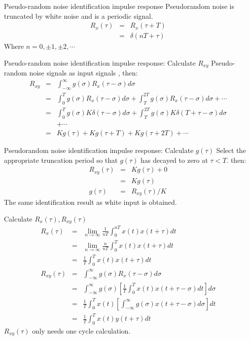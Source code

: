 \begin{frame}{Pseudo-random noise identification impulse response}
Pseudorandom noise is truncated by white noise and is a periodic signal.
\begin{eqnarray*}
R_x(\tau) &=& R_x(\tau+T) \\
&=& \delta(nT+\tau)
\end{eqnarray*}
Where $n=0,\pm 1,\pm 2,\cdots$
\end{frame}

\begin{frame}{Pseudo-random noise identification impulse response: Calculate $R_{xy}$}
Pseudo-random noise signals as input signals , then:
\begin{eqnarray*}
R_{xy} &=& \int_{-\infty}^{\infty} g(\sigma)R_x(\tau-\sigma)d\sigma \\
&=& \int_{0}^{T}g(\sigma)R_x(\tau-\sigma)d\sigma+\int_{T}^{2T}g(\sigma)R_x(\tau-\sigma)d\sigma +\cdots \\
&=& \int_0^T g(\sigma)K\delta(\tau-\sigma)d\sigma+\int_T^{2T}g(\sigma)K\delta(T+\tau-\sigma)d\sigma \\
&& +\cdots \\
&=& Kg(\tau)+Kg(\tau+T)+Kg(\tau+2T)+\cdots
\end{eqnarray*}
\end{frame}

\begin{frame}{Pseudorandom noise identification impulse response: Calculate $g(\tau)$}
Select the appropriate truncation period so that $g(\tau)$ has decayed to zero at $\tau<T$. then:
\begin{eqnarray*}
R_{xy}(\tau)&=& K g(\tau)+0 \\
&=& Kg(\tau) \\
g(\tau)&=& R_{xy}(\tau)/K
\end{eqnarray*}
The same identification result as white input is obtained.
\end{frame}

\begin{frame}{Calculate $R_x(\tau),R_{xy}(\tau)$}
\begin{eqnarray*}
R_x(\tau) &=& \lim_{n \rightarrow \infty}\frac{1}{nT}\int_0^{nT}x(t)x(t+\tau)dt \\
&=&\lim_{n\rightarrow \infty}\frac{n}{nT}\int_0^{T}x(t)x(t+\tau)dt \\
&=&\frac{1}{T}\int_0^{T}x(t)x(t+\tau)dt \\
R_{xy}(\tau) &=& \int_{-\infty}^{\infty}g(\sigma)R_x(\tau-\sigma)d\sigma \\
&=& \int_{-\infty}^{\infty}g(\sigma)\left[\frac{1}{T}\int_0^Tx(t)x(t+\tau-\sigma)dt\right]d\sigma \\
&=& \frac{1}{T}\int_0^T x(t)\left[\int_{-\infty}^{\infty}g(\sigma)x(t+\tau-\sigma)d\sigma\right]dt \\
&=& \frac{1}{T}\int_0^T x(t)y(t+\tau)dt
\end{eqnarray*}
 $R_{xy}(\tau)$ only needs one cycle calculation.
\end{frame}

